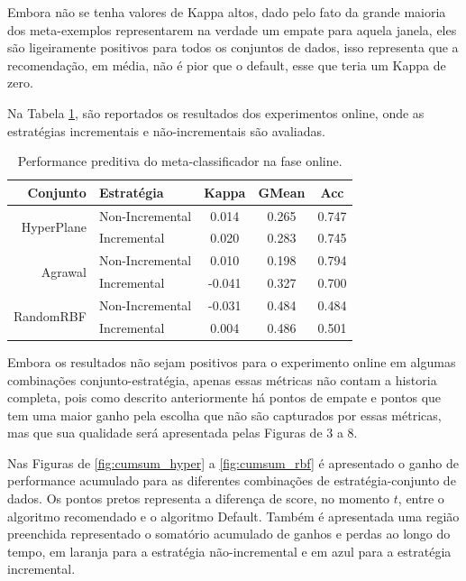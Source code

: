 \documentclass[conference,compsoc]{IEEEtran}
\begin{document}
Embora não se tenha valores de Kappa altos, dado pelo fato da grande maioria dos meta-exemplos representarem na verdade um empate para aquela janela, eles são ligeiramente positivos para todos os conjuntos de dados, isso representa que a recomendação, em média, não é pior que o default, esse que teria um Kappa de zero.

Na Tabela \ref{tab:onmetrics}, são reportados os resultados dos experimentos online, onde as estratégias incrementais e não-incrementais são avaliadas.

\begin{table}[ht]
\caption{Performance preditiva do meta-classificador na fase online.}
\label{tab:onmetrics}
\centering
\begin{tabular}{r|l|c|c|c}
Conjunto     &  Estratégia    & Kappa & GMean & Acc \\ \hline
\multirow{2}{*}{HyperPlane}   &  Non-Incremental       & 0.014 & 0.265  & 0.747    \\
            &  Incremental & 0.020 & 0.283  & 0.745    \\ \hline
\multirow{2}{*}{Agrawal}   &  Non-Incremental       & 0.010 & 0.198  & 0.794    \\
            &  Incremental & -0.041 & 0.327  & 0.700    \\ \hline
\multirow{2}{*}{RandomRBF}   &  Non-Incremental       & -0.031 & 0.484  & 0.484    \\
            &  Incremental & 0.004 & 0.486  & 0.501
\end{tabular}
\end{table}

Embora os resultados não sejam positivos para o experimento online em algumas combinações conjunto-estratégia, apenas essas métricas não contam a historia completa, pois como descrito anteriormente há pontos de empate e pontos que tem uma maior ganho pela escolha que não são capturados por essas métricas, mas que sua qualidade será apresentada pelas Figuras de 3 a 8.

Nas Figuras de \ref{fig:cumsum_hyper} a \ref{fig:cumsum_rbf} é apresentado o ganho de performance acumulado para as diferentes combinações de estratégia-conjunto de dados. Os pontos pretos representa a diferença de score, no momento $t$, entre o algoritmo recomendado e o algoritmo Default.
Também é apresentada uma região preenchida representado o somatório acumulado de ganhos e perdas ao longo do tempo, em laranja para a estratégia não-incremental e em azul para a estratégia incremental.
\end{document}

